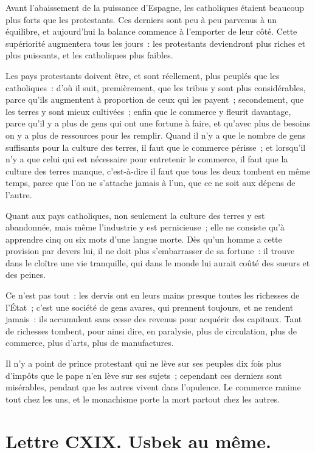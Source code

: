 \documentclass[french,twoside]{book} %
\newcommand{\dateline}[1]{\medskip{\RaggedLeft{#1}\par}\bigskip}
\begin{document}
Avant l’abaissement de la puissance d’Espagne, les catholiques étaient beaucoup plus forts que les protestants. Ces derniers sont peu à peu parvenus à un équilibre, et aujourd’hui la balance commence à l’emporter de leur côté. Cette supériorité augmentera tous les jours : les protestants deviendront plus riches et plus puissants, et les catholiques plus faibles.\par
Les pays protestants doivent être, et sont réellement, plus peuplés que les catholiques : d’où il suit, premièrement, que les tribus y sont plus considérables, parce qu’ils augmentent à proportion de ceux qui les payent ; secondement, que les terres y sont mieux cultivées ; enfin que le commerce y fleurit davantage, parce qu’il y a plus de gens qui ont une fortune à faire, et qu’avec plus de besoins on y a plus de ressources pour les remplir. Quand il n’y a que le nombre de gens suffisants pour la culture des terres, il faut que le commerce périsse ; et lorsqu’il n’y a que celui qui est nécessaire pour entretenir le commerce, il faut que la culture des terres manque, c’est-à-dire il faut que tous les deux tombent en même temps, parce que l’on ne s’attache jamais à l’un, que ce ne soit aux dépens de l’autre.\par
Quant aux pays catholiques, non seulement la culture des terres y est abandonnée, mais même l’industrie y est pernicieuse ; elle ne consiste qu’à apprendre cinq ou six mots d’une langue morte. Dès qu’un homme a cette provision par devers lui, il ne doit plus s’embarrasser de sa fortune : il trouve dans le cloître une vie tranquille, qui dans le monde lui aurait coûté des sueurs et des peines.\par
Ce n’est pas tout : les dervis ont en leurs mains presque toutes les richesses de l’État ; c’est une société de gens avares, qui prennent toujours, et ne rendent jamais : ils accumulent sans cesse des revenus pour acquérir des capitaux. Tant de richesses tombent, pour ainsi dire, en paralysie, plus de circulation, plus de commerce, plus d’arts, plus de manufactures.\par
Il n’y a point de prince protestant qui ne lève sur ses peuples dix fois plus d’impôts que le pape n’en lève sur ses sujets ; cependant ces derniers sont misérables, pendant que les autres vivent dans l’opulence. Le commerce ranime tout chez les uns, et le monachisme porte la mort partout chez les autres.\par

\dateline{De Paris, le 26 de la lune de Chahban, 1718.}
\section[{Lettre CXIX. Usbek au même.}]{Lettre CXIX. Usbek au même.}\renewcommand{\leftmark}{Lettre CXIX. Usbek au même.}
\end{document}
